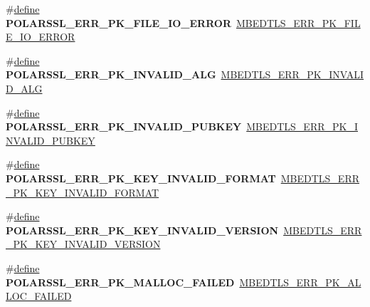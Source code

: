 \begin{DoxyCompactItemize}
\#\hyperlink{structdefine}{define} {\bfseries P\+O\+L\+A\+R\+S\+S\+L\+\_\+\+E\+R\+R\+\_\+\+P\+K\+\_\+\+F\+I\+L\+E\+\_\+\+I\+O\+\_\+\+E\+R\+R\+OR}~\hyperlink{pk_8h_a334a28580efaab3c749fdf1dde28feb8}{M\+B\+E\+D\+T\+L\+S\+\_\+\+E\+R\+R\+\_\+\+P\+K\+\_\+\+F\+I\+L\+E\+\_\+\+I\+O\+\_\+\+E\+R\+R\+OR}
\item 
\mbox{\label{compat-1_83_8h_a3f006a0485438e073549d87796d450cc}} 
\#\hyperlink{structdefine}{define} {\bfseries P\+O\+L\+A\+R\+S\+S\+L\+\_\+\+E\+R\+R\+\_\+\+P\+K\+\_\+\+I\+N\+V\+A\+L\+I\+D\+\_\+\+A\+LG}~\hyperlink{pk_8h_a5d71f30a40d67d5d205a20b69303a341}{M\+B\+E\+D\+T\+L\+S\+\_\+\+E\+R\+R\+\_\+\+P\+K\+\_\+\+I\+N\+V\+A\+L\+I\+D\+\_\+\+A\+LG}
\item 
\mbox{\label{compat-1_83_8h_ae336dc80d29e6aa980b776b54647f443}} 
\#\hyperlink{structdefine}{define} {\bfseries P\+O\+L\+A\+R\+S\+S\+L\+\_\+\+E\+R\+R\+\_\+\+P\+K\+\_\+\+I\+N\+V\+A\+L\+I\+D\+\_\+\+P\+U\+B\+K\+EY}~\hyperlink{pk_8h_a0fdf1044cce5beb387d76d19bf4ef0a2}{M\+B\+E\+D\+T\+L\+S\+\_\+\+E\+R\+R\+\_\+\+P\+K\+\_\+\+I\+N\+V\+A\+L\+I\+D\+\_\+\+P\+U\+B\+K\+EY}
\item 
\mbox{\label{compat-1_83_8h_a0af52f107aa8ae7b6e31facfd18ff44b}} 
\#\hyperlink{structdefine}{define} {\bfseries P\+O\+L\+A\+R\+S\+S\+L\+\_\+\+E\+R\+R\+\_\+\+P\+K\+\_\+\+K\+E\+Y\+\_\+\+I\+N\+V\+A\+L\+I\+D\+\_\+\+F\+O\+R\+M\+AT}~\hyperlink{pk_8h_a291c7d21aa2cd94b2100703e8e3a1d06}{M\+B\+E\+D\+T\+L\+S\+\_\+\+E\+R\+R\+\_\+\+P\+K\+\_\+\+K\+E\+Y\+\_\+\+I\+N\+V\+A\+L\+I\+D\+\_\+\+F\+O\+R\+M\+AT}
\item 
\mbox{\label{compat-1_83_8h_a025c4150348004b381eeb5881737b77a}} 
\#\hyperlink{structdefine}{define} {\bfseries P\+O\+L\+A\+R\+S\+S\+L\+\_\+\+E\+R\+R\+\_\+\+P\+K\+\_\+\+K\+E\+Y\+\_\+\+I\+N\+V\+A\+L\+I\+D\+\_\+\+V\+E\+R\+S\+I\+ON}~\hyperlink{pk_8h_a9b589f81143439f8580b3004dc8ecaf1}{M\+B\+E\+D\+T\+L\+S\+\_\+\+E\+R\+R\+\_\+\+P\+K\+\_\+\+K\+E\+Y\+\_\+\+I\+N\+V\+A\+L\+I\+D\+\_\+\+V\+E\+R\+S\+I\+ON}
\item 
\mbox{\label{compat-1_83_8h_ac615b9e36b084faf6d51dc1f3405e563}} 
\#\hyperlink{structdefine}{define} {\bfseries P\+O\+L\+A\+R\+S\+S\+L\+\_\+\+E\+R\+R\+\_\+\+P\+K\+\_\+\+M\+A\+L\+L\+O\+C\+\_\+\+F\+A\+I\+L\+ED}~\hyperlink{pk_8h_acf55308a7cac0363ea25de294c8b633d}{M\+B\+E\+D\+T\+L\+S\+\_\+\+E\+R\+R\+\_\+\+P\+K\+\_\+\+A\+L\+L\+O\+C\+\_\+\+F\+A\+I\+L\+ED}

\end{DoxyCompactItemize}
